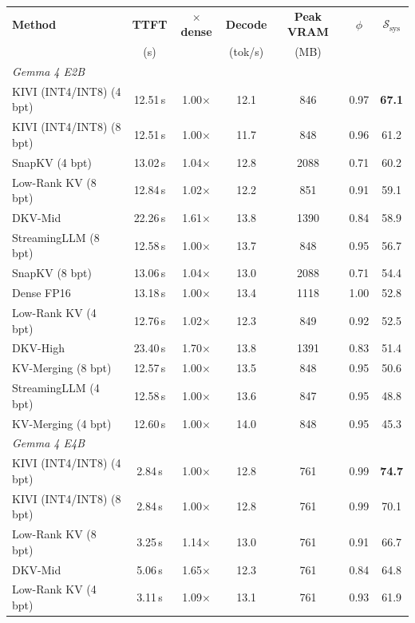 \begin{tabular}{l cc cc cc}
\toprule
\textbf{Method} & \textbf{TTFT} & \textbf{$\times$dense} & \textbf{Decode} & \textbf{Peak VRAM} & $\phi$ & $\mathcal{S}_{\text{sys}}$ \\
 & (s) & & (tok/s) & (MB) & & \\
\midrule
\multicolumn{7}{l}{\textit{Gemma 4 E2B}} \\
\midrule
KIVI (INT4/INT8) (4 bpt) & 12.51\,s & 1.00$\times$ & 12.1 & 846 & 0.97 & \textbf{67.1} \\
KIVI (INT4/INT8) (8 bpt) & 12.51\,s & 1.00$\times$ & 11.7 & 848 & 0.96 & 61.2 \\
SnapKV (4 bpt) & 13.02\,s & 1.04$\times$ & 12.8 & 2088 & 0.71 & 60.2 \\
Low-Rank KV (8 bpt) & 12.84\,s & 1.02$\times$ & 12.2 & 851 & 0.91 & 59.1 \\
DKV-Mid & 22.26\,s & 1.61$\times$ & 13.8 & 1390 & 0.84 & 58.9 \\
StreamingLLM (8 bpt) & 12.58\,s & 1.00$\times$ & 13.7 & 848 & 0.95 & 56.7 \\
SnapKV (8 bpt) & 13.06\,s & 1.04$\times$ & 13.0 & 2088 & 0.71 & 54.4 \\
Dense FP16 & 13.18\,s & 1.00$\times$ & 13.4 & 1118 & 1.00 & 52.8 \\
Low-Rank KV (4 bpt) & 12.76\,s & 1.02$\times$ & 12.3 & 849 & 0.92 & 52.5 \\
DKV-High & 23.40\,s & 1.70$\times$ & 13.8 & 1391 & 0.83 & 51.4 \\
KV-Merging (8 bpt) & 12.57\,s & 1.00$\times$ & 13.5 & 848 & 0.95 & 50.6 \\
StreamingLLM (4 bpt) & 12.58\,s & 1.00$\times$ & 13.6 & 847 & 0.95 & 48.8 \\
KV-Merging (4 bpt) & 12.60\,s & 1.00$\times$ & 14.0 & 848 & 0.95 & 45.3 \\
\midrule
\multicolumn{7}{l}{\textit{Gemma 4 E4B}} \\
\midrule
KIVI (INT4/INT8) (4 bpt) & 2.84\,s & 1.00$\times$ & 12.8 & 761 & 0.99 & \textbf{74.7} \\
KIVI (INT4/INT8) (8 bpt) & 2.84\,s & 1.00$\times$ & 12.8 & 761 & 0.99 & 70.1 \\
Low-Rank KV (8 bpt) & 3.25\,s & 1.14$\times$ & 13.0 & 761 & 0.91 & 66.7 \\
DKV-Mid & 5.06\,s & 1.65$\times$ & 12.3 & 761 & 0.84 & 64.8 \\
Low-Rank KV (4 bpt) & 3.11\,s & 1.09$\times$ & 13.1 & 761 & 0.93 & 61.9 \\

\end{tabular}
